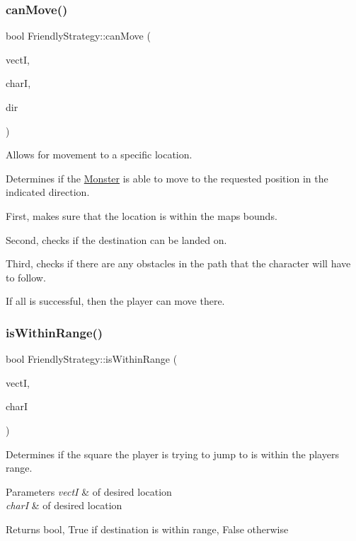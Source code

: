 \subsubsection{\texorpdfstring{can\+Move()}{canMove()}}
{\footnotesize\ttfamily bool Friendly\+Strategy\+::can\+Move (\begin{DoxyParamCaption}\item[{int}]{vectI,  }\item[{int}]{charI,  }\item[{\hyperlink{_movement_strategy_8h_a0b5e764f0ec9a407e9b8789f0259d754}{Movement\+Direction}}]{dir }\end{DoxyParamCaption})}



Allows for movement to a specific location. 

Determines if the \hyperlink{class_monster}{Monster} is able to move to the requested position in the indicated direction. 

First, makes sure that the location is within the map\textquotesingle{}s bounds. 

Second, checks if the destination can be landed on. 

Third, checks if there are any obstacles in the path that the character will have to follow. 

If all is successful, then the player can move there. \hypertarget{class_friendly_strategy_a569177588c0dbf099988222eee8dc8cb}{}\label{class_friendly_strategy_a569177588c0dbf099988222eee8dc8cb} 
\subsubsection{\texorpdfstring{is\+Within\+Range()}{isWithinRange()}}
{\footnotesize\ttfamily bool Friendly\+Strategy\+::is\+Within\+Range (\begin{DoxyParamCaption}\item[{int}]{vectI,  }\item[{int}]{charI }\end{DoxyParamCaption})\hspace{0.3cm}{\ttfamily [virtual]}}

Determines if the square the player is trying to jump to is within the player\textquotesingle{}s range. 
\begin{DoxyParams}{Parameters}
{\em vectI} & of desired location \\
\hline
{\em charI} & of desired location \\
\hline
\end{DoxyParams}
\begin{DoxyReturn}{Returns}
bool, True if destination is within range, False otherwise 
\end{DoxyReturn}


